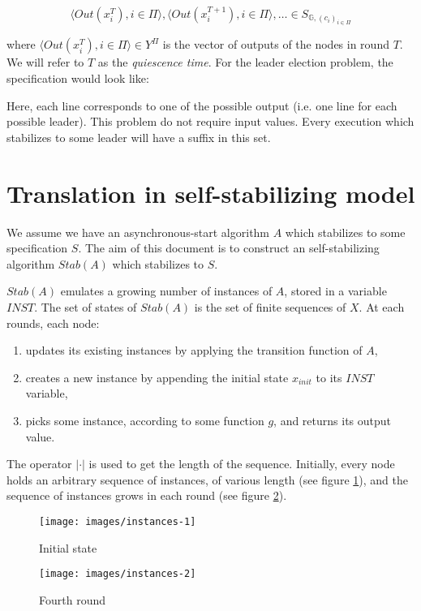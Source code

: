 \documentclass[11pt,letterpaper]{article}
\begin{document}
$$\langle Out(x^T_i), i \in \Pi \rangle, \langle Out(x^{T+1}_i), i \in \Pi \rangle, \dots \in S_{\mathds{G}, (c_i)_{i \in \Pi}}$$

where $\langle Out(x^T_i), i \in \Pi \rangle \in Y^\Pi$ is the vector of outputs of the nodes in round $T$.
We will refer to $T$ as the \textit{quiescence time}.
For the leader election problem, the specification would look like:

Here, each line corresponds to one of the possible output (i.e. one line for each possible leader).
This problem do not require input values.
Every execution which stabilizes to some leader will have a suffix in this set.

\section{Translation in self-stabilizing model}

We assume we have an asynchronous-start algorithm $A$ which stabilizes to some specification $S$.
The aim of this document is to construct an self-stabilizing algorithm $Stab(A)$ which stabilizes to $S$.

$Stab(A)$ emulates a growing number of instances of $A$, stored in a variable $INST$.
The set of states of $Stab(A)$ is the set of finite sequences of $X$.
At each rounds, each node:
\begin{enumerate}
	\item updates its existing instances by applying the transition function of $A$,
	\item creates a new instance by appending the initial state $x_{init}$ to its $INST$ variable,
	\item picks some instance, according to some function $g$, and returns its output value.
\end{enumerate}

The operator $|\cdot|$ is used to get the length of the sequence.
Initially, every node holds an arbitrary sequence of instances, of various length (see figure \ref{fig:fig1}), and the sequence of instances grows in each round (see figure \ref{fig:fig2}).

\begin{figure}[h!]
	\texttt{[image: images/instances-1]}
	\caption{Initial state}
	\label{fig:fig1}
\end{figure}

\begin{figure}[h!]
	\texttt{[image: images/instances-2]}
	\caption{Fourth round}
	\label{fig:fig2}
\end{figure}
\end{document}
